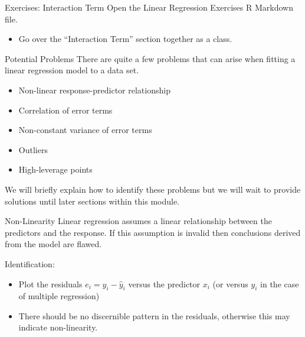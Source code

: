 \documentclass[
  ignorenonframetext,
  aspectratio=169,
]{beamer}
\providecommand{\tightlist}{%
  \setlength{\itemsep}{0pt}\setlength{\parskip}{0pt}}\usepackage{longtable,booktabs,array}
\begin{document}
\begin{frame}{Exercises: Interaction Term}
\protect\hypertarget{exercises-interaction-term}{}
Open the Linear Regression Exercises R Markdown file.

\begin{itemize}
\tightlist
\item
  Go over the ``Interaction Term'' section together as a class.
\end{itemize}
\end{frame}

\begin{frame}{Potential Problems}
\protect\hypertarget{potential-problems}{}
There are quite a few problems that can arise when fitting a linear
regression model to a data set.

\begin{itemize}
\item
  Non-linear response-predictor relationship
\item
  Correlation of error terms
\item
  Non-constant variance of error terms
\item
  Outliers
\item
  High-leverage points
\end{itemize}

We will briefly explain how to identify these problems but we will wait
to provide solutions until later sections within this module.
\end{frame}

\begin{frame}{Non-Linearity}
\protect\hypertarget{non-linearity}{}
Linear regression assumes a linear relationship between the predictors
and the response. If this assumption is invalid then conclusions derived
from the model are flawed.

Identification:

\begin{itemize}
\item
  Plot the residuals \(e_i = y_i - \hat y_i\) versus the predictor
  \(x_i\) (or versus \(y_i\) in the case of multiple regression)
\item
  There should be no discernible pattern in the residuals, otherwise
  this may indicate non-linearity.
\end{itemize}
\end{frame}
\end{document}
